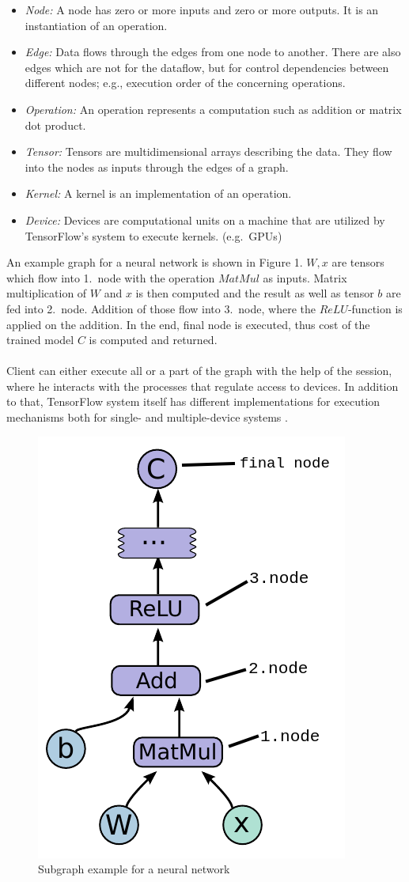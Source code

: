 \documentclass[ieeetran]{article}
\begin{document}
\begin{itemize}
  \item \textit{Node:} A node has zero or more inputs and zero or more outputs. It is an instantiation of an operation.
\item \textit{Edge:} Data flows through the edges from one node to another. There are also edges which are not for the dataflow, but for control dependencies between different nodes; e.g., execution order of the concerning operations.
\item \textit{Operation:} An operation represents a computation such as addition or matrix dot product.
\item \textit{Tensor:} Tensors are multidimensional arrays describing the data. They flow into the nodes as inputs through the edges of a graph.
\item \textit{Kernel:} A kernel is an implementation of an operation.
\item \textit{Device:} Devices are computational units on a machine that are utilized by TensorFlow's system to execute kernels. (e.g.\ GPUs)
\end{itemize}
An example graph for a neural network is shown in Figure 1. $W, x$ are tensors which flow into 1.\ node with the operation $MatMul$ as inputs. Matrix multiplication of $W$ and $x$ is then computed and the result as well as tensor $b$ are fed into 2.\ node. Addition of those flow into 3.\ node, where the $ReLU$-function is applied on the addition. In the end, final node is executed, thus cost of the trained model $C$ is computed and returned.
\\ \\Client can either execute all or a part of the graph with the help of the session, where he interacts with the processes that regulate access to devices. In addition to that, TensorFlow system itself has different implementations for execution mechanisms both for single- and multiple-device systems \cite{first}.
\begin{figure}[h!]
  \centering
   \includegraphics[width=0.25\linewidth]{graph}
\caption[placeholder]{Subgraph example for a neural network\footnotemark}
  \label{fig:graph_caption_placeholder_subgraph_example_for_a_neural_networkfootnotemark}
\end{figure}
\end{document}
